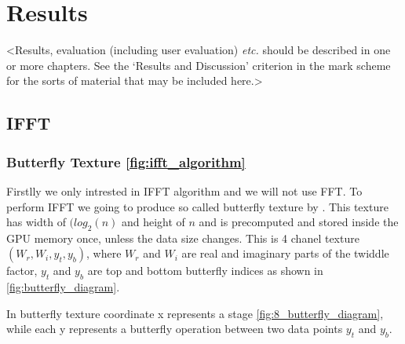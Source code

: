 \chapter{Results}
\label{chapter3}

<Results, evaluation (including user evaluation) {\em etc.} should be described in one or more chapters. See the `Results and Discussion' criterion in the mark scheme for the sorts of material that may be included here.>




\section{IFFT}
\subsection{Butterfly Texture \ref{fig:ifft_algorithm}}
Firstlly we only intrested in IFFT algorithm and we will not use FFT.
To perform IFFT we going to produce so called butterfly texture by \cite[Fl{\"u}gge Fynn-Jorin]{flugge2017}.
This texture has width of $(log_2(n)$ and height of $n$ and is precomputed and stored inside the GPU memory once, unless the data size changes. This is 4 chanel texture $(W_r, W_i, y_t, y_b)$,
where $W_r$ and $W_i$ are real and imaginary parts of the twiddle factor, $y_t$ and $y_b$ are top and bottom butterfly indices as shown in \ref{fig:butterfly_diagram}.

In butterfly texture coordinate x represents a stage \ref{fig:8_butterfly_diagram}, while each y represents a butterfly operation between two data points $y_t$ and $y_b$.

